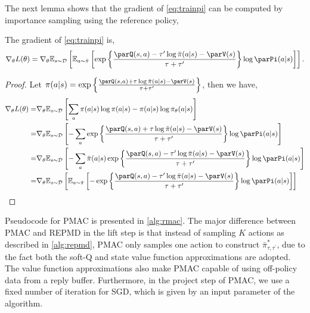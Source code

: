 The next lemma shows that the gradient of \cref{eq:trainpi} can be computed by importance sampling using the reference policy, 
\begin{lem}
\label{lem:rmacgradientestimate}
The gradient of \cref{eq:trainpi} is,
\begin{equation}
\label{eq:mac_gradient_estimator}
	\nabla_\theta L(\theta) = \nabla_\theta \E_{s \sim \gD} \left[ \E_{a\sim \refPi}\left[  \exp\left\{ \frac{\parQ(s,a) - \tau' \log \refPi(a|s) - \parV(s)}{\tau+\tau'} \right\} \log \parPi(a |s) \right]   \right].
\end{equation}
\end{lem}
\begin{proof}
Let $\pi(a \vert s) =  \exp\left\{ \frac{\parQ(s,a) + \tau \log \refPi(a|s) - \parV(s)}{\tau+\tau'} \right\}$, then we have,
\begin{align*}
\nabla_\theta L(\theta) = & \nabla_\theta  \E_{s \sim \gD} \left[\sum_a  \pi(a|s) \log \pi(a|s) - \pi(a|s) \log \pi_\theta(a|s) \right]\\
= & \nabla_\theta \E_{s \sim \gD} \left[ -\sum_a \exp\left\{ \frac{\parQ(s,a) + \tau \log \refPi(a|s) - \parV(s)}{\tau+\tau'} \right\} \log \parPi(a |s) \right] \\ 
= & \nabla_\theta \E_{s \sim \gD} \left[ -\sum_a \refPi(a|s) \exp\left\{ \frac{\parQ(s,a) - \tau' \log \refPi(a|s) - \parV(s)}{\tau+\tau'} \right\} \log \parPi(a |s) \right] \\ 
= & \nabla_\theta \E_{s \sim \gD} \left[ \E_{a\sim \refPi}\left[ - \exp\left\{ \frac{\parQ(s,a) - \tau' \log \refPi(a|s) - \parV(s)}{\tau+\tau'} \right\} \log \parPi(a |s) \right]   \right] 
\end{align*}
\end{proof}
Pseudocode for PMAC is presented in \cref{alg:rmac}. The major difference between PMAC and REPMD in the lift step is that instead of sampling $K$ actions as described in \cref{alg:repmd}, PMAC only samples one action to construct $\bar{\pi}_{\tau,\tau^{\prime}}^*$, due to the fact both the soft-Q and state value function approximations are adopted. The value function approximations also make PMAC capable of using off-policy data from a reply buffer. Furthermore, in the project step of PMAC, we use a fixed number of iteration for SGD, which is given by an input parameter of the algorithm.

